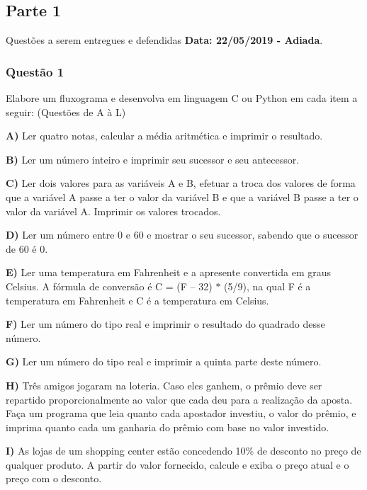 \subsection*{Parte 1}

Questões a serem entregues e defendidas {\bfseries{Data\+: 22/05/2019 -\/ Adiada}}.

\subsubsection*{Questão 1}


\begin{DoxyItemize}
\item Elabore um fluxograma e desenvolva em linguagem C ou Python em cada item a seguir\+: (Questões de A à L)
\item {\bfseries{A)}} Ler quatro notas, calcular a média aritmética e imprimir o resultado.
\item {\bfseries{B)}} Ler um número inteiro e imprimir seu sucessor e seu antecessor.
\item {\bfseries{C)}} Ler dois valores para as variáveis A e B, efetuar a troca dos valores de forma que a variável A passe a ter o valor da variável B e que a variável B passe a ter o valor da variável A. Imprimir os valores trocados.
\item {\bfseries{D)}} Ler um número entre 0 e 60 e mostrar o seu sucessor, sabendo que o sucessor de 60 é 0.
\item {\bfseries{E)}} Ler uma temperatura em Fahrenheit e a apresente convertida em graus Celsius. A fórmula de conversão é C = (F – 32) $\ast$ (5/9), na qual F é a temperatura em Fahrenheit e C é a temperatura em Celsius.
\item {\bfseries{F)}} Ler um número do tipo real e imprimir o resultado do quadrado desse número.
\item {\bfseries{G)}} Ler um número do tipo real e imprimir a quinta parte deste número.
\item {\bfseries{H)}} Três amigos jogaram na loteria. Caso eles ganhem, o prêmio deve ser repartido proporcionalmente ao valor que cada deu para a realização da aposta. Faça um programa que leia quanto cada apostador investiu, o valor do prêmio, e imprima quanto cada um ganharia do prêmio com base no valor investido.
\item {\bfseries{I)}} As lojas de um shopping center estão concedendo 10\% de desconto no preço de qualquer produto. A partir do valor fornecido, calcule e exiba o preço atual e o preço com o desconto.

\end{DoxyItemize}
